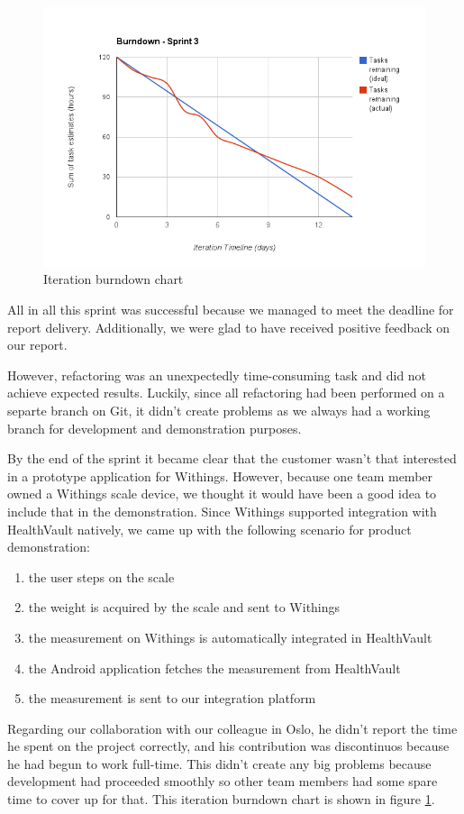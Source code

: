 \begin{figure}
\centering
\includegraphics[scale=0.60]{../Figures/burndownSprint3.png}
\caption{Iteration burndown chart}
\label{figure:burndownsprint3}
\end{figure}

All in all this sprint was successful because we managed to meet the deadline for report delivery.
Additionally, we were glad to have received positive feedback on our report.

However, refactoring was an unexpectedly time-consuming task and did not achieve expected results.
Luckily, since all refactoring had been performed on a separte branch on Git, it didn't create problems as we always had a working branch for development and demonstration purposes.

By the end of the sprint it became clear that the customer wasn't that interested in a prototype application for Withings. 
However, because one team member owned a Withings scale device, we thought it would have been a good idea to include that in the demonstration.
Since Withings supported integration with HealthVault natively, we came up with the following scenario for product demonstration:
\begin{enumerate}[1)]
\item the user steps on the scale
\item the weight is acquired by the scale and sent to Withings
\item the measurement on Withings is automatically integrated in HealthVault
\item the Android application fetches the measurement from HealthVault
\item the measurement is sent to our integration platform
\end{enumerate}
Regarding our collaboration with our colleague in Oslo, he didn't report the time he spent on the project correctly, and his contribution was discontinuos because he had begun to work full-time.
This didn't create any big problems because development had proceeded smoothly so other team members had some spare time to cover up for that.
This iteration burndown chart is shown in figure \ref{figure:burndownsprint3}.

